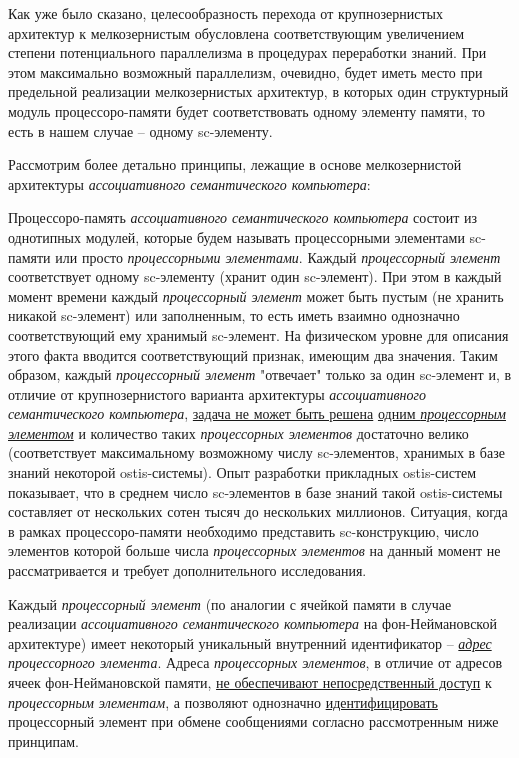 Как уже было сказано, целесообразность перехода от крупнозернистых архитектур к мелкозернистым обусловлена  соответствующим увеличением степени потенциального параллелизма в процедурах переработки знаний. При этом максимально возможный параллелизм, очевидно, будет иметь место при предельной реализации мелкозернистых архитектур, в которых один структурный модуль процессоро-памяти будет соответствовать одному элементу памяти, то есть в нашем случае -- одному sc-элементу.

Рассмотрим более детально принципы, лежащие в основе мелкозернистой архитектуры \textit{ассоциативного семантического компьютера}:
\begin{textitemize}
	\item Процессоро-память \textit{ассоциативного семантического компьютера} состоит из однотипных модулей, которые будем называть процессорными элементами sc-памяти или просто \textit{процессорными элементами}. Каждый \textit{процессорный элемент} соответствует одному sc-элементу (хранит один sc-элемент). При этом в каждый момент времени каждый \textit{процессорный элемент} может быть пустым (не хранить никакой sc-элемент) или заполненным, то есть иметь взаимно однозначно соответствующий ему хранимый sc-элемент. На физическом уровне для описания этого факта вводится соответствующий признак, имеющим два значения. Таким образом, каждый \textit{процессорный элемент} "отвечает"{} только за один sc-элемент и, в отличие от крупнозернистого варианта архитектуры \textit{ассоциативного семантического компьютера}, \underline{задача не может быть решена} \underline{одним \textit{процессорным элементом}} и количество таких \textit{процессорных элементов} достаточно велико (соответствует максимальному возможному числу sc-элементов, хранимых в базе знаний некоторой ostis-системы). Опыт разработки прикладных ostis-систем показывает, что в среднем число sc-элементов в базе знаний такой ostis-системы составляет от нескольких сотен тысяч до нескольких миллионов. Ситуация, когда в рамках процессоро-памяти необходимо представить sc-конструкцию, число элементов которой больше числа \textit{процессорных элементов} на данный момент не рассматривается и требует дополнительного исследования.
	\item Каждый \textit{процессорный элемент} (по аналогии с ячейкой памяти в случае реализации \textit{ассоциативного семантического компьютера} на фон-Неймановской архитектуре) имеет некоторый уникальный внутренний идентификатор -- \textit{\underline{адрес} процессорного элемента}. Адреса \textit{процессорных элементов}, в отличие от адресов ячеек фон-Неймановской памяти, \underline{не обеспечивают непосредственный доступ} к \textit{процессорным элементам}, а позволяют однозначно \underline{идентифицировать} процессорный элемент при обмене сообщениями согласно рассмотренным ниже принципам.

\end{textitemize}

